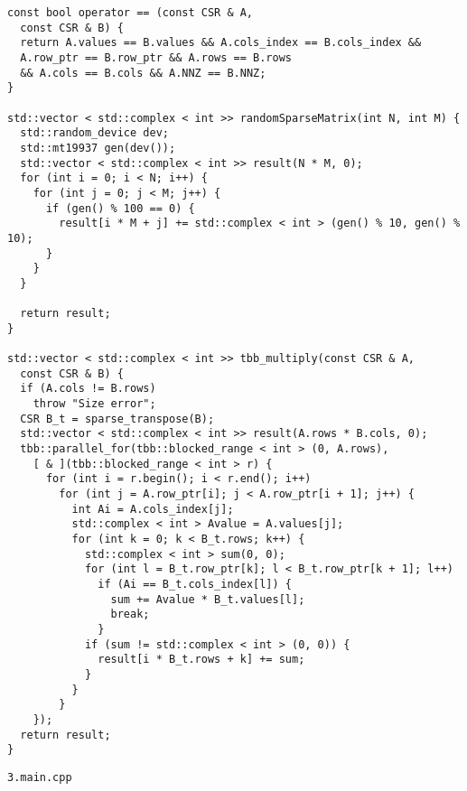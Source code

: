\documentclass{report}
\begin{document}
\begin{lstlisting}
const bool operator == (const CSR & A,
  const CSR & B) {
  return A.values == B.values && A.cols_index == B.cols_index &&
  A.row_ptr == B.row_ptr && A.rows == B.rows
  && A.cols == B.cols && A.NNZ == B.NNZ;
}

std::vector < std::complex < int >> randomSparseMatrix(int N, int M) {
  std::random_device dev;
  std::mt19937 gen(dev());
  std::vector < std::complex < int >> result(N * M, 0);
  for (int i = 0; i < N; i++) {
    for (int j = 0; j < M; j++) {
      if (gen() % 100 == 0) {
        result[i * M + j] += std::complex < int > (gen() % 10, gen() % 10);
      }
    }
  }

  return result;
}

std::vector < std::complex < int >> tbb_multiply(const CSR & A,
  const CSR & B) {
  if (A.cols != B.rows)
    throw "Size error";
  CSR B_t = sparse_transpose(B);
  std::vector < std::complex < int >> result(A.rows * B.cols, 0);
  tbb::parallel_for(tbb::blocked_range < int > (0, A.rows),
    [ & ](tbb::blocked_range < int > r) {
      for (int i = r.begin(); i < r.end(); i++)
        for (int j = A.row_ptr[i]; j < A.row_ptr[i + 1]; j++) {
          int Ai = A.cols_index[j];
          std::complex < int > Avalue = A.values[j];
          for (int k = 0; k < B_t.rows; k++) {
            std::complex < int > sum(0, 0);
            for (int l = B_t.row_ptr[k]; l < B_t.row_ptr[k + 1]; l++)
              if (Ai == B_t.cols_index[l]) {
                sum += Avalue * B_t.values[l];
                break;
              }
            if (sum != std::complex < int > (0, 0)) {
              result[i * B_t.rows + k] += sum;
            }
          }
        }
    });
  return result;
}
\end{lstlisting}
\par \verb|3.main.cpp|
\end{document}
